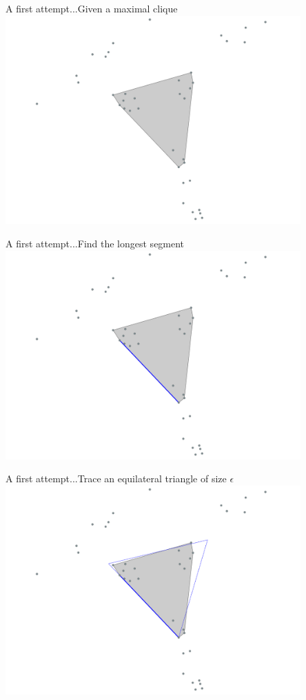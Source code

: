 \documentclass{beamer}
\begin{document}
\begin{frame}{A first attempt...}{Given a maximal clique}
    \centering
    \includegraphics[width=0.85\textwidth]{figures/clique_69}
\end{frame}
\begin{frame}{A first attempt...}{Find the longest segment}
    \centering
    \includegraphics[width=0.85\textwidth]{figures/segment_69}
\end{frame}
\begin{frame}{A first attempt...}{Trace an equilateral triangle of size $\epsilon$}
    \centering
    \includegraphics[width=0.85\textwidth]{figures/triangle_69}
\end{frame}
\end{document}
